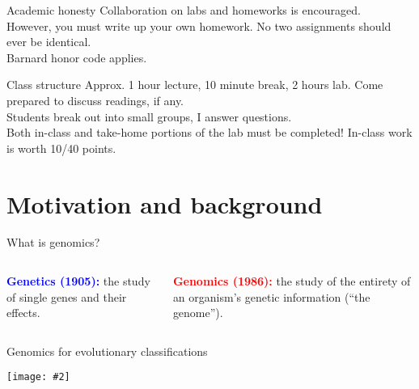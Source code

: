 \documentclass{beamer}
\renewcommand{\c}[1]{\begin{center}#1\end{center}}
\newcommand{\blu}[1]{\textcolor{blue}{\textbf{#1}}}
\newcommand{\red}[1]{\textcolor{red}{\textbf{#1}}}
\newcommand{\gr}[2][.95]{\c{\texttt{[image: \#2]}}}
\begin{document}
\begin{frame}{Academic honesty}
Collaboration on labs and homeworks is encouraged.\\
\bigskip
However, you must write up your own homework. No two assignments should ever be identical.\\
\bigskip
Barnard honor code applies.
\end{frame}

\begin{frame}{Class structure}
Approx. 1 hour lecture, 10 minute break, 2 hours lab. Come prepared to discuss readings, if any. \\
\bigskip
Students break out into small groups, I answer questions.\\
\bigskip
Both in-class and take-home portions of the lab must be completed! In-class work is worth 10/40 points.
\end{frame}

\section{Motivation and background}


\begin{frame}{What is genomics?}
\begin{columns}[t]
\small
\begin{column}{0.5\textwidth}
    \blu{Genetics (1905):} the study of single genes and their effects.\\
    \vspace{4em}
    \fbox{\gr{l1_figs/s3_tree.png}}
    \end{column}
\begin{column}{0.5\textwidth}
    \red{Genomics (1986):} the study of the entirety of an organism's genetic information (``the genome'').\\
    \vspace{1em}
    \fbox{\gr{l1_figs/s3_genome.png}}
    \end{column}
\end{columns}
\end{frame}

\begin{frame}{Genomics for evolutionary classifications}
\gr{l1_figs/s4_related.png}
\end{frame}
\end{document}
